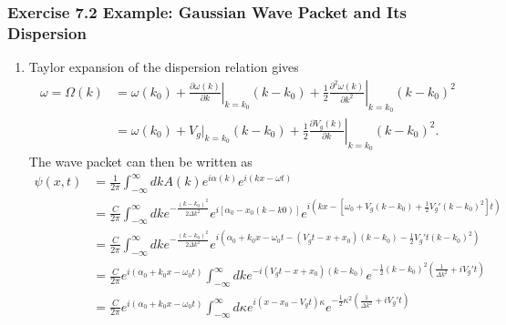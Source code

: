 \documentclass[10pt,a4paper]{article}
\theoremstyle{definition}
\begin{document}
\subsubsection{Exercise 7.2 Example: Gaussian Wave Packet and Its Dispersion}
\begin{enumerate}[label=(\alph*)]
\item Taylor expansion of the dispersion relation gives
\begin{align}
    \omega=\Omega(k)&=\omega(k_0)+\left.\frac{\partial \omega(k)}{\partial k}\right|_{k=k_0}(k-k_0)+\frac{1}{2}\left.\frac{\partial^2\omega(k)}{\partial k^2}\right|_{k=k_0}(k-k_0)^2\\
    &=\omega(k_0)+V_g|_{k=k_0}(k-k_0)+\frac{1}{2}\left.\frac{\partial V_g(k)}{\partial k}\right|_{k=k_0}(k-k_0)^2.
\end{align}
The wave packet can then be written as
\begin{align}
   \psi(x,t)
   &=\frac{1}{2\pi}\int_{-\infty}^\infty dk A(k)e^{i\alpha(k)}e^{i(kx-\omega t)}\\
   &=\frac{C}{2\pi}\int_{-\infty}^\infty dk e^{-\frac{(k-k_0)^2}{2\Delta k^2}}e^{i[\alpha_0-x_0(k-k0)]}e^{i(kx-[\omega_0+V_g(k-k_0)+\frac{1}{2}V_g'(k-k_0)^2] t)}\\
   &=\frac{C}{2\pi}\int_{-\infty}^\infty dk e^{-\frac{(k-k_0)^2}{2\Delta k^2}}e^{i(\alpha_0+k_0x-\omega_0t-(V_gt-x+x_0)(k-k_0)-\frac{1}{2}V_g't (k-k_0)^2)}\\
   &=\frac{C}{2\pi}e^{i(\alpha_0+k_0x-\omega_0t)}\int_{-\infty}^\infty dk e^{-i(V_gt-x+x_0)(k-k_0)} e^{-\frac{1}{2}(k-k_0)^2\left(\frac{1}{\Delta k^2}+iV_g't\right)}\\
   &=\frac{C}{2\pi}e^{i(\alpha_0+k_0x-\omega_0t)}\int_{-\infty}^\infty d\kappa e^{i(x-x_0-V_gt)\kappa} e^{-\frac{1}{2}\kappa^2\left(\frac{1}{\Delta k^2}+iV_g't\right)}\\
\end{align}


\end{enumerate}
\end{document}
